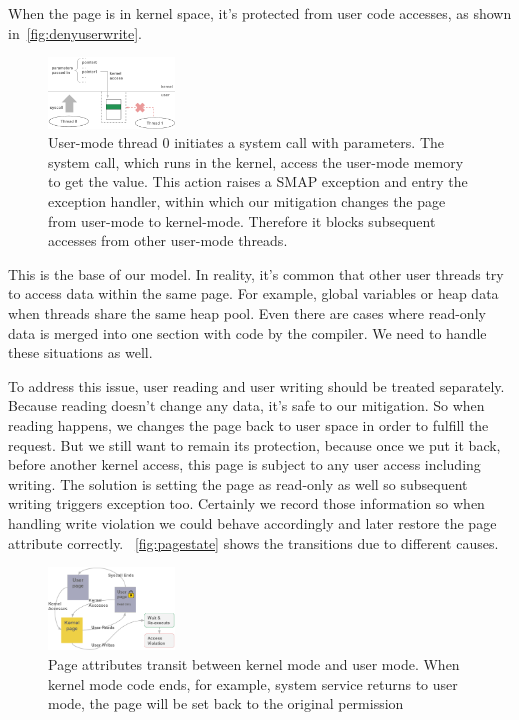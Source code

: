 When the page is in kernel space, it's protected from user code accesses, as shown in~\autoref{fig:denyuserwrite}.

\begin{figure}[th]
  \includegraphics[width=0.30\textwidth]{figures/denyuserwrite}
  \centering
  \caption{User-mode thread 0 initiates a system call with parameters. The system call, which runs in the kernel, access the user-mode memory to get the value. This action raises a SMAP exception and entry the exception handler, within which our mitigation changes the page from user-mode to kernel-mode. Therefore it blocks subsequent accesses from other user-mode threads.}
  \label{fig:denyuserwrite}
\end{figure}


This is the base of our model. In reality, it's common that other user threads try to access data within the same page. For example, global variables or heap data when threads share the same heap pool. Even there are cases where read-only data is merged into one section with code by the compiler. We need to handle these situations as well.

To address this issue, user reading and user writing should be treated separately. Because reading doesn't change any data, it's safe to our mitigation. So when reading happens, we changes the page back to user space in order to fulfill the request. But we still want to remain its protection, because once we put it back, before another kernel access, this page is subject to any user access including writing. The solution is setting the page as read-only as well so subsequent writing triggers exception too. Certainly we record those information so when handling write violation we could behave accordingly and later restore the page attribute correctly. ~\autoref{fig:pagestate} shows the transitions due to different causes. 


\begin{figure}[th]
  \includegraphics[width=0.30\textwidth]{figures/pagestate}
  \centering
  \caption{Page attributes transit between kernel mode and user mode. When kernel mode code ends, for example, system service returns to user mode, the page will be set back to the original permission}
  \label{fig:pagestate}
\end{figure}


